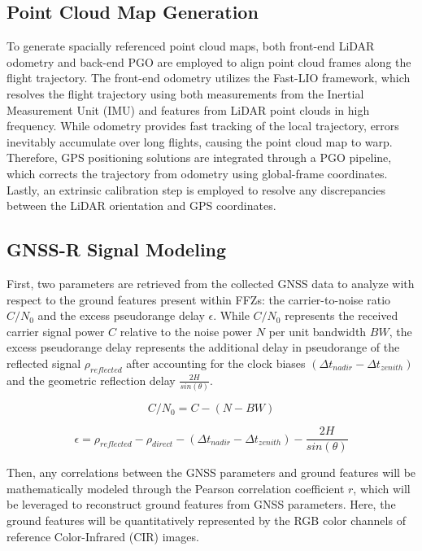 \documentclass[10pt, a4paper]{article}
\begin{document}
\subsection{Point Cloud Map Generation}
To generate spacially referenced point cloud maps, both front-end LiDAR odometry and back-end PGO are employed to align point cloud frames along the flight trajectory. The front-end odometry utilizes the Fast-LIO framework, which resolves the flight trajectory using both measurements from the Inertial Measurement Unit (IMU) and features from LiDAR point clouds in high frequency. While odometry provides fast tracking of the local trajectory, errors inevitably accumulate over long flights, causing the point cloud map to warp. Therefore, GPS positioning solutions are integrated through a PGO pipeline, which corrects the trajectory from odometry using global-frame coordinates. Lastly, an extrinsic calibration step is employed to resolve any discrepancies between the LiDAR orientation and GPS coordinates.

\subsection{GNSS-R Signal Modeling}
First, two parameters are retrieved from the collected GNSS data to analyze with respect to the ground features present within FFZs: the carrier-to-noise ratio $C/N_0$ and the excess pseudorange delay $\epsilon$. While $C/N_0$ represents the received carrier signal power $C$ relative to the noise power $N$ per unit bandwidth $BW$, the excess pseudorange delay represents the additional delay in pseudorange of the reflected signal $\rho_{reflected}$ after accounting for the clock biases $(\Delta t_{nadir} - \Delta t_{zenith})$ and the geometric reflection delay $\frac{2H}{sin(\theta)}$. 

\begin{equation}
    C/N_0 = C - (N - BW)
\end{equation}

\begin{equation}
    \epsilon = \rho_{reflected} - \rho_{direct} - (\Delta t_{nadir} - \Delta t_{zenith}) - \frac{2H}{sin(\theta)}
\end{equation}

Then, any correlations between the GNSS parameters and ground features will be mathematically modeled through the Pearson correlation coefficient $r$, which will be leveraged to reconstruct ground features from GNSS parameters. Here, the ground features will be quantitatively represented by the RGB color channels of reference Color-Infrared (CIR) images. 
\end{document}
